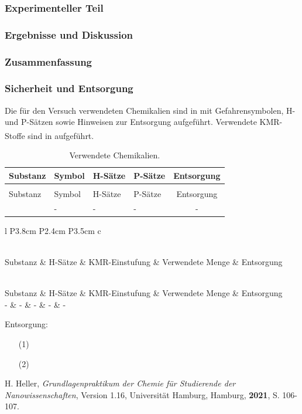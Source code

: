 \documentclass[
	a4paper,										%
	12pt,											%
	twoside,										%
	headsepline,								%
	footsepline,									%
	captions=tableheading,					%
]{scrartcl}
\newcommand{\zitat}[1]{\textsuperscript{\cite{#1}}}
\newcommand{\langetabelle}[6]{  %
	\begin{centering}           %
		{\begin{longtable}[#3]{#4}
				\caption{#2\label{tab: #1}}\\				
				\hline
				#5
				\hline
				\endfirsthead
                \caption{#2\label{tab: #1}}\\
				\hline
				#5
				\hline
				\endhead
				#6												
				\hline 
		\end{longtable}}
\end{centering}}
\begin{document}
\subsubsection{Experimenteller Teil}

\subsubsection{Ergebnisse und Diskussion}

\subsubsection{Zusammenfassung}

\subsubsection{Sicherheit und Entsorgung}
		
Die für den Versuch verwendeten Chemikalien sind in  mit Gefahrensymbolen, H- und P-Sätzen sowie Hinweisen zur Entsorgung aufgeführt. Verwendete KMR-Stoffe sind in  aufgeführt.\zitat{entsorgung1}
	
\langetabelle
	{entsorgung1}
	{Verwendete Chemikalien.}
	{H}  %
	{l p{1.4cm} p{2.2cm} p{4.5cm} c}
	{Substanz & Symbol & H-Sätze & P-Sätze & Entsorgung \\}
	{ \ce{KClO4} & - & - & - & - \\}

\langetabelle
	{KMR1}
	{Verwendete kanzerogene, mutagene oder reproduktionstoxische Gefahrstoffe (KMR).}
	{H}
	{l P{3.8cm} P{2.4cm} P{3.5cm} c}
	{Substanz & H-Sätze & KMR-Einstufung & Verwendete Menge & Entsorgung \\}
	{ - & - & - & - & - \\}
	
Entsorgung: \\
\begin{itemize}
    \item[(1)] 
    \item[(2)] 
\end{itemize}	

\newpage

\begin{thebibliography}{4}		%

						{H. Heller}, 
			\textit	{Grundlagenpraktikum der Chemie für Studierende der Nanowissenschaften}, 
						{Version 1.16}, 
						{Universität Hamburg}, 
						{Hamburg}, 
			\textbf	{2021}, 
			S.			{106-107}.
			
\end{thebibliography}
\end{document}
